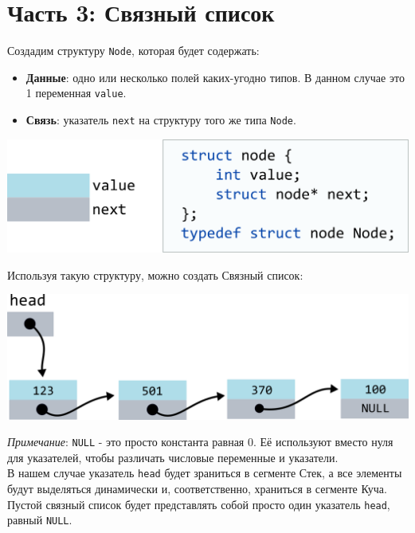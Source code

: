 \documentclass{article}
\begin{document}
\section*{Часть 3: Связный список}
Создадим структуру \texttt{Node}, которая будет содержать:
\begin{itemize}
\item \textbf{Данные}: одно или несколько полей каких-угодно типов. В данном случае это 1 переменная \texttt{value}.
\item \textbf{Связь}: указатель \texttt{next} на структуру того же типа \texttt{Node}.
\end{itemize}
\begin{center}
\includegraphics[scale=0.8]{../images/structlist.png}
\end{center}

Используя такую структуру, можно создать Связный список:
\begin{center}
\includegraphics[scale=0.8]{../images/codelist/codelist_only.png}
\end{center}
\textit{Примечание}: \texttt{NULL} - это просто константа равная 0. Её используют вместо нуля для указателей, чтобы различать числовые переменные и указатели.\\

В нашем случае указатель \texttt{head} будет зраниться в сегменте Стек, а все элементы будут выделяться динамически и, соответственно, храниться в сегменте Куча. Пустой связный список будет представлять собой просто один указатель \texttt{head}, равный \texttt{NULL}.
\end{document}

